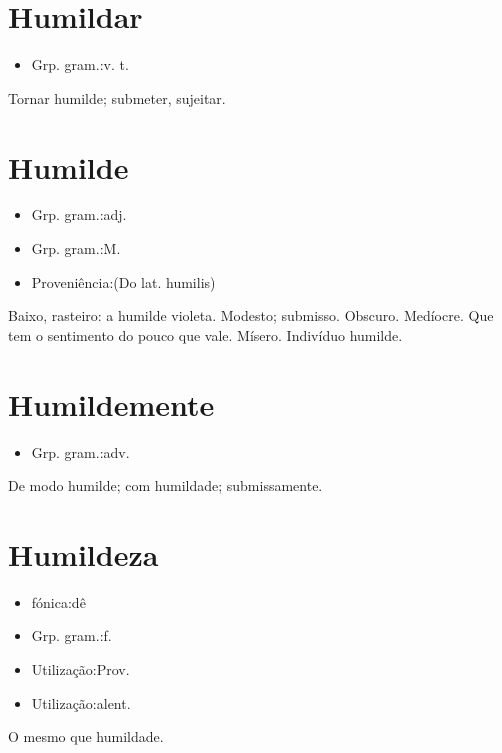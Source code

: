 \documentclass{article}
\begin{document}
\section{Humildar}
\begin{itemize}
\item {Grp. gram.:v. t.}
\end{itemize}
Tornar humilde; submeter, sujeitar.
\section{Humilde}
\begin{itemize}
\item {Grp. gram.:adj.}
\end{itemize}
\begin{itemize}
\item {Grp. gram.:M.}
\end{itemize}
\begin{itemize}
\item {Proveniência:(Do lat. \textunderscore humilis\textunderscore )}
\end{itemize}
Baixo, rasteiro: \textunderscore a humilde violeta\textunderscore .
Modesto; submisso.
Obscuro.
Medíocre.
Que tem o sentimento do pouco que vale.
Mísero.
Indivíduo humilde.
\section{Humildemente}
\begin{itemize}
\item {Grp. gram.:adv.}
\end{itemize}
De modo humilde; com humildade; submissamente.
\section{Humildeza}
\begin{itemize}
\item {fónica:dê}
\end{itemize}
\begin{itemize}
\item {Grp. gram.:f.}
\end{itemize}
\begin{itemize}
\item {Utilização:Prov.}
\end{itemize}
\begin{itemize}
\item {Utilização:alent.}
\end{itemize}
O mesmo que \textunderscore humildade\textunderscore .
\end{document}
